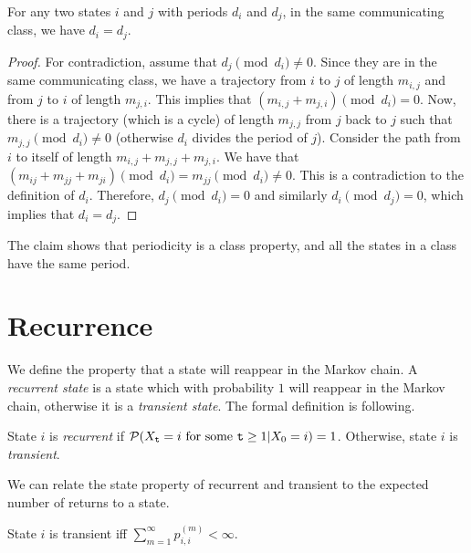 \begin{claim}
For any two states $i$ and $j$ with periods $d_i$ and $d_j$, in the
same communicating class, we have $d_i=d_j$.
\end{claim}
\begin{proof}
For contradiction, assume that $d_j \pmod {d_i}\neq 0$. Since they
are in the same communicating class, we have a trajectory from $i$
to $j$ of length $m_{i,j}$ and from $j$ to $i$ of length $m_{j,i}$.
This implies that $(m_{i,j}+m_{j,i})\pmod {d_i}=0$. Now, there is a
trajectory (which is a cycle) of length $m_{j,j}$ from $j$ back to
$j$ such that $m_{j,j}\pmod {d_i}\neq 0$ (otherwise $d_i$ divides
the period of $j$). Consider the path from $i$ to itself of length
$m_{i,j}+m_{j,j}+m_{j,i}$. We have that $(m_{ij}+m_{jj}+m_{ji})\pmod
{d_i} = m_{jj}\pmod {d_i} \neq 0$. This is a contradiction to the
definition of $d_i$. Therefore, $d_j \pmod {d_i}=0$ and similarly
$d_i \pmod {d_j}=0$, which implies that $d_i=d_j$.
\end{proof}
The claim shows that periodicity is a class property, and all the
states in a class have the same period.


\section{Recurrence}
We define the property that a state will reappear in the Markov chain. A \emph{recurrent state} is a state which with probability $1$ will reappear in the Markov chain, otherwise it is a \emph{transient state}. The formal definition is following.
\begin{definition}
State $i$ is \emph{recurrent} if ${\cal P}({X_{\tt t}} = i {
\textrm{ for some }}{\tt t} \ge 1|{X_0} = i) = 1$. Otherwise, state $i$ is
\emph{transient}.    
\end{definition}

We can relate the state property of recurrent and transient to the
expected number of returns to a state.

\begin{claim}
State $i$ is transient iff $\sum\nolimits_{m = 1}^\infty
{p_{i,i}^{(m)}}  < \infty $.
\end{claim}

